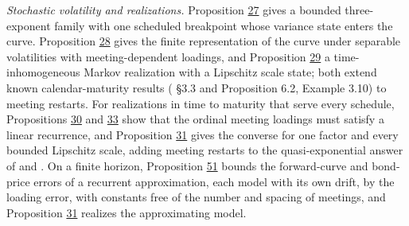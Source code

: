 \documentclass[11pt]{article}
\begin{document}
\emph{Stochastic volatility and realizations.} Proposition \hyperref[res:Proposition-27]{27} gives a bounded three-exponent family with one scheduled breakpoint whose variance state enters the curve. Proposition \hyperref[res:Proposition-28]{28} gives the finite representation of the curve under separable volatilities with meeting-dependent loadings, and Proposition \hyperref[res:Proposition-29]{29} a time-inhomogeneous Markov realization with a Lipschitz scale state; both extend known calendar-maturity results (\cite{bjork2001existence} §3.3 and Proposition 6.2, \cite{fontana2022term} Example 3.10) to meeting restarts. For realizations in time to maturity that serve every schedule, Propositions \hyperref[res:Proposition-30]{30} and \hyperref[res:Proposition-33]{33} show that the ordinal meeting loadings must satisfy a linear recurrence, and Proposition \hyperref[res:Proposition-31]{31} gives the converse for one factor and every bounded Lipschitz scale, adding meeting restarts to the quasi-exponential answer of \cite{bjork2001existence} and \cite{bjork2004finite}. On a finite horizon, Proposition \hyperref[res:Proposition-51]{51} bounds the forward-curve and bond-price errors of a recurrent approximation, each model with its own drift, by the loading error, with constants free of the number and spacing of meetings, and Proposition \hyperref[res:Proposition-31]{31} realizes the approximating model.
\end{document}
